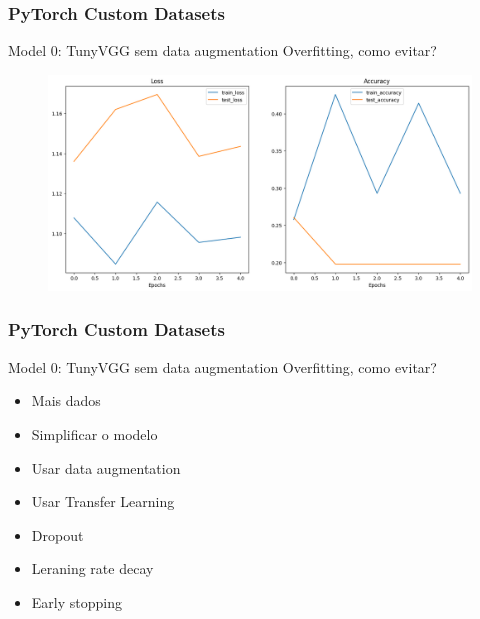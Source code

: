 \documentclass{beamer}
\begin{document}
\begin{frame}
	\frametitle{PyTorch Custom Datasets}
	\begin{block}{Model 0: TunyVGG sem data augmentation}
		Overfitting, como evitar?
		\begin{figure}
			\centering
			\includegraphics[width=1\linewidth]{figures/acc_curve_over}
		\end{figure}

	\end{block}
\end{frame} 
\begin{frame}
	\frametitle{PyTorch Custom Datasets}
	\begin{block}{Model 0: TunyVGG sem data augmentation}
		Overfitting, como evitar?		
		\begin{itemize}
			\item Mais dados
			\item Simplificar o modelo
			\item Usar data augmentation
			\item Usar Transfer Learning
			\item Dropout
			\item Leraning rate decay
			\item Early stopping
		\end{itemize}
	\end{block}
\end{frame} 
\end{document}
